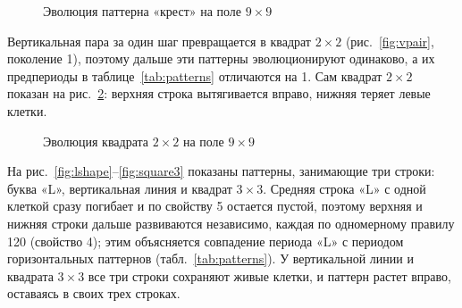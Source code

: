 \begin{figure}[H]
	\centering
	\begin{minipage}{0.23\textwidth}\centering{}\end{minipage}
	\begin{minipage}{0.23\textwidth}\centering{}\end{minipage}
	\begin{minipage}{0.23\textwidth}\centering{}\end{minipage}
	\begin{minipage}{0.23\textwidth}\centering{}\end{minipage}
	\caption{Эволюция паттерна «крест» на поле $9 \times 9$}
	\label{fig:cross}
\end{figure}

Вертикальная пара за один шаг превращается в квадрат $2 \times 2$ (рис.~\ref{fig:vpair}, поколение 1), поэтому дальше эти паттерны эволюционируют одинаково, а их предпериоды в таблице~\ref{tab:patterns} отличаются на 1. Сам квадрат $2 \times 2$ показан на рис.~\ref{fig:square}: верхняя строка вытягивается вправо, нижняя теряет левые клетки.

\begin{figure}[H]
	\centering
	\begin{minipage}{0.23\textwidth}\centering{}\end{minipage}
	\begin{minipage}{0.23\textwidth}\centering{}\end{minipage}
	\begin{minipage}{0.23\textwidth}\centering{}\end{minipage}
	\begin{minipage}{0.23\textwidth}\centering{}\end{minipage}
	\caption{Эволюция квадрата $2 \times 2$ на поле $9 \times 9$}
	\label{fig:square}
\end{figure}

На рис.~\ref{fig:lshape}--\ref{fig:square3} показаны паттерны, занимающие три строки: буква «L», вертикальная линия и квадрат $3 \times 3$. Средняя строка «L» с одной клеткой сразу погибает и по свойству 5 остается пустой, поэтому верхняя и нижняя строки дальше развиваются независимо, каждая по одномерному правилу 120 (свойство 4); этим объясняется совпадение периода «L» с периодом горизонтальных паттернов (табл.~\ref{tab:patterns}). У вертикальной линии и квадрата $3 \times 3$ все три строки сохраняют живые клетки, и паттерн растет вправо, оставаясь в своих трех строках.


